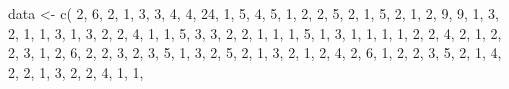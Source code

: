 \documentclass[
]{book}
\newenvironment{Shaded}{\begin{snugshade}}{\end{snugshade}}
\newcommand{\DecValTok}[1]{\textcolor[rgb]{0.00,0.00,0.81}{#1}}
\newcommand{\FunctionTok}[1]{\textcolor[rgb]{0.00,0.00,0.00}{#1}}
\newcommand{\NormalTok}[1]{#1}
\newcommand{\OtherTok}[1]{\textcolor[rgb]{0.56,0.35,0.01}{#1}}
\theoremstyle{definition}
\theoremstyle{definition}
\theoremstyle{definition}
\theoremstyle{definition}
\theoremstyle{remark}
\begin{document}
\begin{Shaded}
\begin{Highlighting}[]
\NormalTok{data }\OtherTok{\textless{}{-}} \FunctionTok{c}\NormalTok{(}
  \DecValTok{2}\NormalTok{, }\DecValTok{6}\NormalTok{, }\DecValTok{2}\NormalTok{, }\DecValTok{1}\NormalTok{, }\DecValTok{3}\NormalTok{, }\DecValTok{3}\NormalTok{, }\DecValTok{4}\NormalTok{, }\DecValTok{4}\NormalTok{, }\DecValTok{24}\NormalTok{, }\DecValTok{1}\NormalTok{, }\DecValTok{5}\NormalTok{, }\DecValTok{4}\NormalTok{, }\DecValTok{5}\NormalTok{, }\DecValTok{1}\NormalTok{,  }\DecValTok{2}\NormalTok{, }\DecValTok{2}\NormalTok{, }\DecValTok{5}\NormalTok{, }\DecValTok{2}\NormalTok{, }\DecValTok{1}\NormalTok{, }\DecValTok{5}\NormalTok{, }
  \DecValTok{2}\NormalTok{, }\DecValTok{1}\NormalTok{, }\DecValTok{2}\NormalTok{, }\DecValTok{9}\NormalTok{, }\DecValTok{9}\NormalTok{, }\DecValTok{1}\NormalTok{, }\DecValTok{3}\NormalTok{, }\DecValTok{2}\NormalTok{, }\DecValTok{1}\NormalTok{,  }\DecValTok{1}\NormalTok{, }\DecValTok{3}\NormalTok{, }\DecValTok{1}\NormalTok{, }\DecValTok{3}\NormalTok{, }\DecValTok{2}\NormalTok{,  }\DecValTok{2}\NormalTok{, }\DecValTok{4}\NormalTok{, }\DecValTok{1}\NormalTok{, }\DecValTok{1}\NormalTok{, }\DecValTok{5}\NormalTok{, }\DecValTok{3}\NormalTok{, }
  \DecValTok{3}\NormalTok{, }\DecValTok{2}\NormalTok{, }\DecValTok{2}\NormalTok{, }\DecValTok{1}\NormalTok{, }\DecValTok{1}\NormalTok{, }\DecValTok{1}\NormalTok{, }\DecValTok{5}\NormalTok{, }\DecValTok{1}\NormalTok{, }\DecValTok{3}\NormalTok{,  }\DecValTok{1}\NormalTok{, }\DecValTok{1}\NormalTok{, }\DecValTok{1}\NormalTok{, }\DecValTok{1}\NormalTok{, }\DecValTok{2}\NormalTok{,  }\DecValTok{2}\NormalTok{, }\DecValTok{4}\NormalTok{, }\DecValTok{2}\NormalTok{, }\DecValTok{1}\NormalTok{, }\DecValTok{2}\NormalTok{, }\DecValTok{2}\NormalTok{, }
  \DecValTok{3}\NormalTok{, }\DecValTok{1}\NormalTok{, }\DecValTok{2}\NormalTok{, }\DecValTok{6}\NormalTok{, }\DecValTok{2}\NormalTok{, }\DecValTok{2}\NormalTok{, }\DecValTok{3}\NormalTok{, }\DecValTok{2}\NormalTok{, }\DecValTok{3}\NormalTok{,  }\DecValTok{5}\NormalTok{, }\DecValTok{1}\NormalTok{, }\DecValTok{3}\NormalTok{, }\DecValTok{2}\NormalTok{, }\DecValTok{5}\NormalTok{,  }\DecValTok{2}\NormalTok{, }\DecValTok{1}\NormalTok{, }\DecValTok{3}\NormalTok{, }\DecValTok{2}\NormalTok{, }\DecValTok{1}\NormalTok{, }\DecValTok{2}\NormalTok{, }
  \DecValTok{4}\NormalTok{, }\DecValTok{2}\NormalTok{, }\DecValTok{6}\NormalTok{, }\DecValTok{1}\NormalTok{, }\DecValTok{2}\NormalTok{, }\DecValTok{2}\NormalTok{, }\DecValTok{3}\NormalTok{, }\DecValTok{5}\NormalTok{, }\DecValTok{2}\NormalTok{,  }\DecValTok{1}\NormalTok{, }\DecValTok{4}\NormalTok{, }\DecValTok{2}\NormalTok{, }\DecValTok{2}\NormalTok{, }\DecValTok{1}\NormalTok{,  }\DecValTok{3}\NormalTok{, }\DecValTok{2}\NormalTok{, }\DecValTok{2}\NormalTok{, }\DecValTok{4}\NormalTok{, }\DecValTok{1}\NormalTok{, }\DecValTok{1}\NormalTok{, }

\end{Highlighting}
\end{Shaded}
\end{document}
